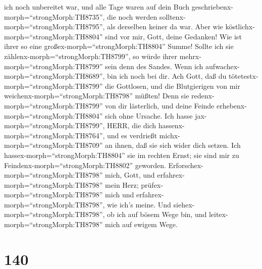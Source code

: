 ich noch unbereitet war, und alle Tage waren auf dein Buch
geschriebenx-morph=``strongMorph:TH8735'', die noch werden
solltenx-morph=``strongMorph:TH8795'', als derselben keiner da war.
 Aber wie köstlichx-morph=``strongMorph:TH8804'' sind vor
mir, Gott, deine Gedanken! Wie ist ihrer so eine
großex-morph=``strongMorph:TH8804'' Summe!  Sollte ich sie
zählenx-morph=``strongMorph:TH8799'', so würde ihrer
mehrx-morph=``strongMorph:TH8799'' sein denn des Sandes. Wenn ich
aufwachex-morph=``strongMorph:TH8689'', bin ich noch bei dir.
 Ach Gott, daß du tötetestx-morph=``strongMorph:TH8799''
die Gottlosen, und die Blutgierigen von mir
weichenx-morph=``strongMorph:TH8798'' müßten!  Denn sie
redenx-morph=``strongMorph:TH8799'' von dir lästerlich, und deine Feinde
erhebenx-morph=``strongMorph:TH8804'' sich ohne Ursache. 
Ich hasse jax-morph=``strongMorph:TH8799'', HERR, die dich
hassenx-morph=``strongMorph:TH8764'', und es verdrießt
michx-morph=``strongMorph:TH8709'' an ihnen, daß sie sich wider dich
setzen.  Ich hassex-morph=``strongMorph:TH8804'' sie im
rechten Ernst; sie sind mir zu Feindenx-morph=``strongMorph:TH8802''
geworden.  Erforschex-morph=``strongMorph:TH8798'' mich,
Gott, und erfahrex-morph=``strongMorph:TH8798'' mein Herz;
prüfex-morph=``strongMorph:TH8798'' mich und
erfahrex-morph=``strongMorph:TH8798'', wie ich's meine. 
Und siehex-morph=``strongMorph:TH8798'', ob ich auf bösem Wege bin, und
leitex-morph=``strongMorph:TH8798'' mich auf ewigem Wege.

\hypertarget{section-139}{%
\section{140}\label{section-139}}

